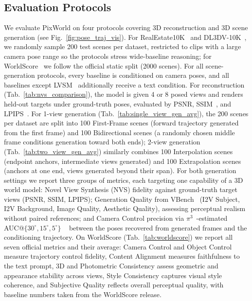 \subsection{Evaluation Protocols}
\label{sec:eval_protocol}
We evaluate PixWorld on four protocols covering 3D reconstruction and 3D scene generation (see Fig.~\ref{fig:pose_traj_vis}). For RealEstate10K~\citep{zhou2018stereo} and DL3DV-10K~\citep{ling2024dl3dv}, we randomly sample 200 test scenes per dataset, restricted to clips with a large camera pose range so the protocols stress wide-baseline reasoning; for WorldScore~\citep{duan2025worldscore} we follow the official static split (2000 scenes). For all scene-generation protocols, every baseline is conditioned on camera poses, and all baselines except LVSM~\citep{jinlvsm} additionally receive a text condition. For reconstruction (Tab.~\ref{tab:nvs_comparison}), the model is given 4 or 8 posed views and renders held-out targets under ground-truth poses, evaluated by PSNR, SSIM~\citep{wang2004image}, and LPIPS~\citep{zhang2018unreasonable}. For 1-view generation (Tab.~\ref{tab:single_view_gen_avg}), the 200 scenes per dataset are split into 100 First-Frame scenes (forward trajectory generated from the first frame) and 100 Bidirectional scenes (a randomly chosen middle frame conditions generation toward both ends); 2-view generation (Tab.~\ref{tab:two_view_gen_avg}) similarly combines 100 Interpolation scenes (endpoint anchors, intermediate views generated) and 100 Extrapolation scenes (anchors at one end, views generated beyond their span). For both generation settings we report three groups of metrics, each targeting one capability of a 3D world model: Novel View Synthesis (NVS) fidelity against ground-truth target views (PSNR, SSIM, LPIPS); Generation Quality from VBench~\citep{huang2024vbench} (I2V Subject, I2V Background, Image Quality, Aesthetic Quality), assessing perceptual realism without paired references; and Camera Control precision via $\pi^3$~\citep{wang2025pi}-estimated AUC@$\{30^\circ, 15^\circ, 5^\circ\}$ ~\citep{wang2025taming} between the poses recovered from generated frames and the conditioning trajectory. On WorldScore (Tab.~\ref{tab:worldscore}) we report all seven official metrics and their average: Camera Control and Object Control measure trajectory control fidelity, Content Alignment measures faithfulness to the text prompt, 3D and Photometric Consistency assess geometric and appearance stability across views, Style Consistency captures visual style coherence, and Subjective Quality reflects overall perceptual quality, with baseline numbers taken from the WorldScore release.



